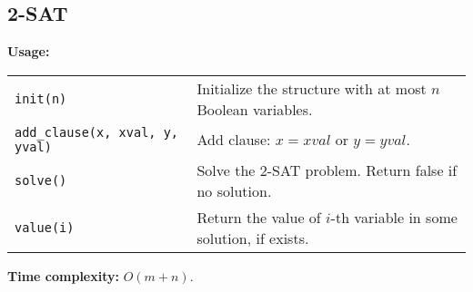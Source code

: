 \subsection{2-SAT}
\textbf{Usage:} \\[0.1cm]
\begin{tabular}{p{2.5cm} p{9cm}}
  \lstinline|init(n)| & Initialize the structure with at most $n$ Boolean variables. \\
  \lstinline|add_clause(x, xval, y, yval)| & Add clause: $x = xval$ or $y = yval$.  \\
  \lstinline|solve()| & Solve the 2-SAT problem. Return false if no solution. \\
  \lstinline|value(i)| & Return the value of $i$-th variable in some solution, if exists. \\
\end{tabular} \par
\textbf{Time complexity:} $O(m+n)$. \par


